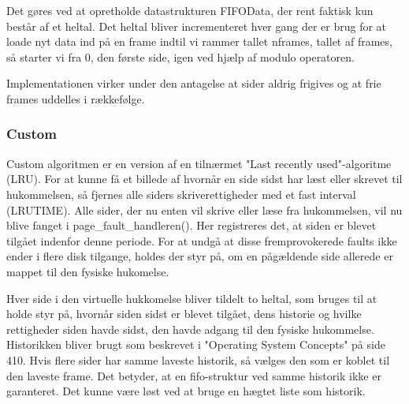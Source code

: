 Det gøres ved at opretholde datastrukturen FIFOData, der rent faktisk kun består af et heltal. Det heltal bliver incrementeret hver gang der er brug for at loade nyt data ind på en frame indtil vi rammer tallet nframes, tallet af frames, så starter vi fra 0, den første side, igen ved hjælp af modulo operatoren.

Implementationen virker under den antagelse at sider aldrig frigives og at frie frames uddelles i rækkefølge.

\subsubsection*{Custom}
Custom algoritmen er en version af en tilnærmet "Last recently used"-algoritme (LRU). For at kunne få et billede af hvornår en side sidst har læst eller skrevet til hukommelsen, så fjernes alle siders skriverettigheder med et fast interval (LRUTIME). Alle sider, der nu enten vil skrive eller læse fra hukommelsen, vil nu blive fanget i page\_fault\_handleren(). Her registreres det, at siden er blevet tilgået indenfor denne periode. For at undgå at disse fremprovokerede faults ikke ender i flere disk tilgange, holdes der styr på, om en pågældende side allerede er mappet til den fysiske hukomelse.

Hver side i den virtuelle hukkomelse bliver tildelt to heltal, som bruges til at holde styr på, hvornår siden sidst er blevet tilgået, dens historie og hvilke rettigheder siden havde sidst, den havde adgang til den fysiske hukommelse. Historikken bliver brugt som beskrevet i "Operating System Concepts" på side 410. Hvis flere sider har samme laveste historik, så vælges den som er koblet til den laveste frame. Det betyder, at en fifo-struktur ved samme historik ikke er garanteret. Det kunne være løst ved at bruge en hægtet liste som historik.